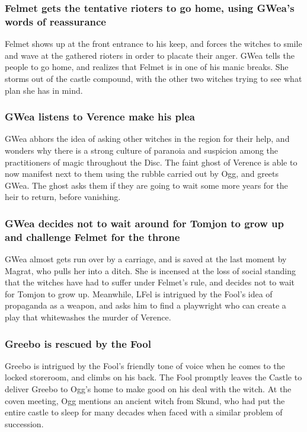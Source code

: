 \subsubsection{\Gls{Felmet} gets the tentative rioters to go home, using \Gls{GWea}'s words of
    reassurance}
\Gls{Felmet} shows up at the front entrance to his keep, and forces the witches to smile and wave
at the gathered rioters in order to placate their anger. \Gls{GWea} tells the people to go home, and
realizes that \Gls{Felmet} is in one of his manic breaks. She storms out of the castle compound,
with the other two witches trying to see what plan she has in mind.

\subsubsection{\Gls{GWea} listens to \Gls{Verence} make his plea}
\Gls{GWea} abhors the idea of asking other witches in the region for their help, and wonders why
there is a strong culture of paranoia and suspicion among the practitioners of magic throughout the
Disc. The faint ghost of \Gls{Verence} is able to now manifest next to them using the rubble carried
out by \Gls{Ogg}, and greets \Gls{GWea}. The ghost asks them if they are going to wait some more
years for the heir to return, before vanishing.

\subsubsection{\Gls{GWea} decides not to wait around for \Gls{Tomjon} to grow up and challenge
    \Gls{Felmet} for the throne}
\Gls{GWea} almost gets run over by a carriage, and is saved at the last moment by \Gls{Magrat}, who
pulls her into a ditch. She is incensed at the loss of social standing that the witches have had to
suffer under \Gls{Felmet}'s rule, and decides not to wait for \Gls{Tomjon} to grow up. Meanwhile,
\Gls{LFel} is intrigued by the \Gls{Fool}'s idea of propaganda as a weapon, and asks him to find
a playwright who can create a play that whitewashes the murder of \Gls{Verence}.

\subsubsection{\Gls{Greebo} is rescued by the \Gls{Fool}}
\Gls{Greebo} is intrigued by the \Gls{Fool}'s friendly tone of voice when he comes to the locked
storeroom, and climbs on his back. The \Gls{Fool} promptly leaves the Castle to deliver \Gls{Greebo}
to \Gls{Ogg}'s home to make good on his deal with the witch. At the coven meeting, \Gls{Ogg}
mentions an ancient witch from Skund, who had put the entire castle to sleep for many decades when
faced with a similar problem of succession.

